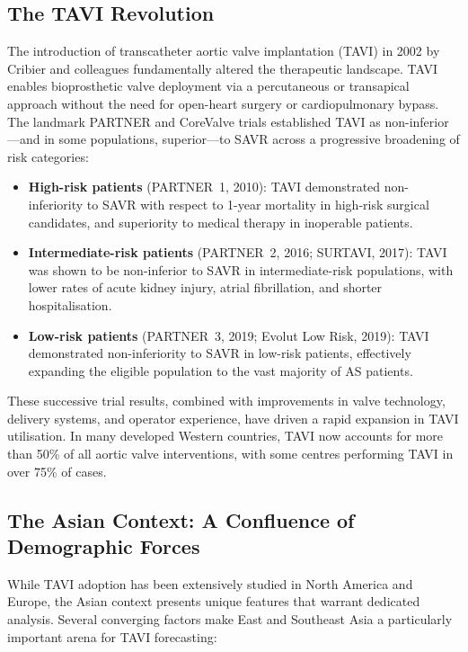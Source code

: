 \documentclass[12pt, a4paper]{article}
\begin{document}
\subsection{The TAVI Revolution}

The introduction of transcatheter aortic valve implantation (TAVI) in 2002 by Cribier and colleagues fundamentally altered the therapeutic landscape. TAVI enables bioprosthetic valve deployment via a percutaneous or transapical approach without the need for open-heart surgery or cardiopulmonary bypass. The landmark PARTNER and CoreValve trials established TAVI as non-inferior---and in some populations, superior---to SAVR across a progressive broadening of risk categories:

\begin{itemize}[leftmargin=*, itemsep=4pt]
    \item \textbf{High-risk patients} (PARTNER~1, 2010): TAVI demonstrated non-inferiority to SAVR with respect to 1-year mortality in high-risk surgical candidates, and superiority to medical therapy in inoperable patients.
    \item \textbf{Intermediate-risk patients} (PARTNER~2, 2016; SURTAVI, 2017): TAVI was shown to be non-inferior to SAVR in intermediate-risk populations, with lower rates of acute kidney injury, atrial fibrillation, and shorter hospitalisation.
    \item \textbf{Low-risk patients} (PARTNER~3, 2019; Evolut Low Risk, 2019): TAVI demonstrated non-inferiority to SAVR in low-risk patients, effectively expanding the eligible population to the vast majority of AS patients.
\end{itemize}

These successive trial results, combined with improvements in valve technology, delivery systems, and operator experience, have driven a rapid expansion in TAVI utilisation. In many developed Western countries, TAVI now accounts for more than 50\% of all aortic valve interventions, with some centres performing TAVI in over 75\% of cases.

\subsection{The Asian Context: A Confluence of Demographic Forces}

While TAVI adoption has been extensively studied in North America and Europe, the Asian context presents unique features that warrant dedicated analysis. Several converging factors make East and Southeast Asia a particularly important arena for TAVI forecasting:
\end{document}
